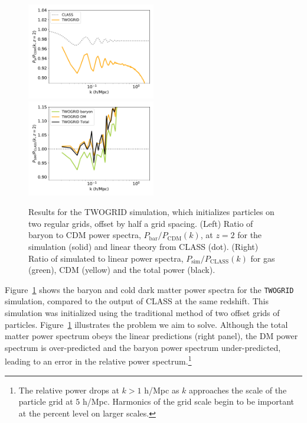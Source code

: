\documentclass[a4paper,11pt]{article}
\begin{document}
\begin{figure}
  \includegraphics[width=0.5\textwidth]{plots/literature_2_relpower.pdf}
\includegraphics[width=0.5\textwidth]{plots/literature_2_class.pdf}
\caption{Results for the TWOGRID simulation, which initializes particles on two regular grids, offset by half a grid spacing. (Left) Ratio of baryon to CDM power spectra, $P_\mathrm{bar}/P_\mathrm{CDM}(k)$, at $z=2$ for the simulation (solid) and linear theory from CLASS (dot). (Right) Ratio of simulated to linear power spectra, $P_\mathrm{sim}/P_\mathrm{CLASS}(k)$ for gas (green), CDM (yellow) and the total power (black).}
  \label{fig:offsetgrids}
\end{figure}

Figure~\ref{fig:offsetgrids} shows the baryon and cold dark matter power spectra for the \texttt{TWOGRID} simulation, compared to the output of CLASS at the same redshift. This simulation was initialized using the traditional method of two offset grids of particles. Figure~\ref{fig:offsetgrids} illustrates the problem we aim to solve. Although the total matter power spectrum obeys the linear predictions (right panel), the DM power spectrum is over-predicted and the baryon power spectrum under-predicted, leading to an error in the relative power spectrum.\footnote{The relative power drops at $k > 1$ h/Mpc as $k$ approaches the scale of the particle grid at $5$ h/Mpc. Harmonics of the grid scale begin to be important at the percent level on larger scales.}
\end{document}
